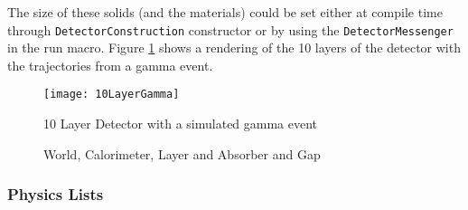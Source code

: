 The size of these solids (and the materials) could be set either at compile time through \verb+DetectorConstruction+ constructor or by using the \verb+DetectorMessenger+ in the run macro.
Figure \ref{fig:LayerDetectorGeo} shows a rendering of the 10 layers of the detector with the trajectories from a gamma event.

\begin{figure}[h] 
    \texttt{[image: 10LayerGamma]}
	\caption{10 Layer Detector with a simulated gamma event}
    \label{fig:LayerDetectorGeo}
\end{figure}
\begin{figure}[h] 
	\caption{World, Calorimeter, Layer and Absorber and Gap}
    \label{fig:GeoDiagram}
\end{figure}

\subsubsection{Physics Lists}

